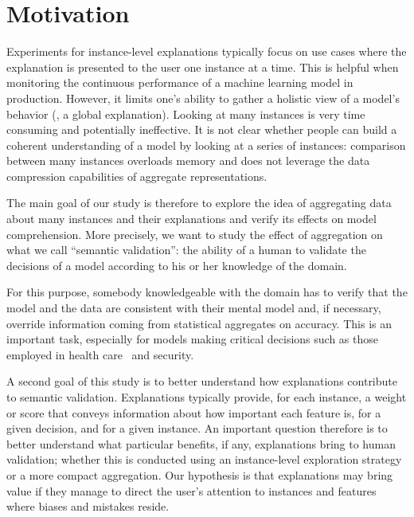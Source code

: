 \section{Motivation}
\label{sec:motivation}

Experiments for instance-level explanations typically focus on use cases where the explanation is presented to the user one instance at a time. This is helpful when monitoring the continuous performance of a machine learning model in production. However, it limits one's ability to gather a holistic view of a model's behavior (\ie, a global explanation). Looking at many instances is very time consuming and potentially ineffective. It is not clear whether people can build a coherent understanding of a model by looking at a series of instances: comparison between many instances overloads memory and does not leverage the data compression capabilities of aggregate representations.

The main goal of our study is therefore to explore the idea of aggregating data about many instances and their explanations and verify its effects on model comprehension. More precisely, we want to study the effect of aggregation on what we call ``semantic validation'': the ability of a human to validate the decisions of a model according to his or her knowledge of the domain.

For this purpose, somebody knowledgeable with the domain has to verify that the model and the data are consistent with their mental model and, if necessary, override information coming from statistical aggregates on accuracy. This is an important task, especially for models making critical decisions such as those employed in health care~\cite{Caruana:2015:IMH:2783258.2788613} and security.

A second goal of this study is to better understand how explanations contribute to semantic validation. Explanations typically provide, for each instance, a weight or score that conveys information about how important each feature is, for a given decision, and for a given instance. An important question therefore is to better understand what particular benefits, if any, explanations bring to human validation; whether this is conducted using an instance-level exploration strategy or a more compact aggregation. Our hypothesis is that explanations may bring value if they manage to direct the user's attention to instances and features where biases and mistakes reside.

